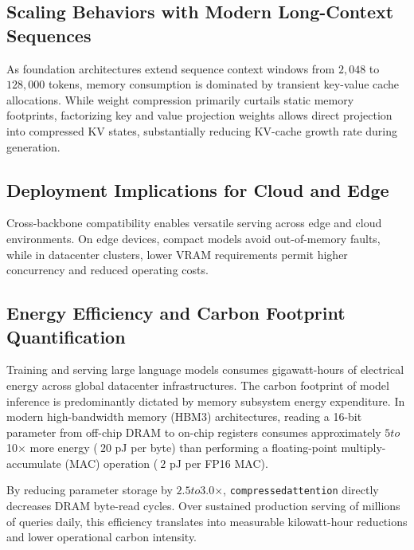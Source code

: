 \subsection{Scaling Behaviors with Modern Long-Context Sequences}
As foundation architectures extend sequence context windows from $2{,}048$ to $128{,}000$ tokens, memory consumption is dominated by transient key-value cache allocations. While weight compression primarily curtails static memory footprints, factorizing key and value projection weights allows direct projection into compressed KV states, substantially reducing KV-cache growth rate during generation.

\subsection{Deployment Implications for Cloud and Edge}
Cross-backbone compatibility enables versatile serving across edge and cloud environments. On edge devices, compact models avoid out-of-memory faults, while in datacenter clusters, lower VRAM requirements permit higher concurrency and reduced operating costs.

\subsection{Energy Efficiency and Carbon Footprint Quantification}
Training and serving large language models consumes gigawatt-hours of electrical energy across global datacenter infrastructures. The carbon footprint of model inference is predominantly dictated by memory subsystem energy expenditure. In modern high-bandwidth memory (HBM3) architectures, reading a 16-bit parameter from off-chip DRAM to on-chip registers consumes approximately $5$\times$ to $10$\times$ more energy ($~20$ pJ per byte) than performing a floating-point multiply-accumulate (MAC) operation ($~2$ pJ per FP16 MAC).

By reducing parameter storage by $2.5$\times$ to $3.0$\times$, \texttt{compressedattention} directly decreases DRAM byte-read cycles. Over sustained production serving of millions of queries daily, this efficiency translates into measurable kilowatt-hour reductions and lower operational carbon intensity.

